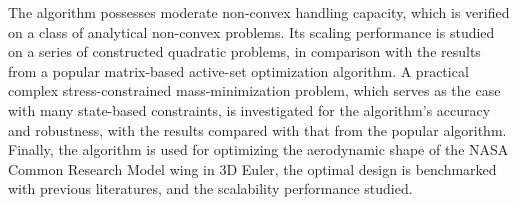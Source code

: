The algorithm possesses moderate non-convex handling capacity, which is verified on a class of analytical non-convex problems. Its scaling performance is studied on a series of constructed quadratic problems, in comparison with the results from a popular matrix-based active-set optimization algorithm. A practical complex stress-constrained mass-minimization problem, which serves as the case with many state-based constraints, is investigated for the algorithm's accuracy and robustness, with the results compared with that from the popular algorithm. Finally, the algorithm is used for optimizing the aerodynamic shape of the NASA Common Research Model wing in 3D Euler, the optimal design is benchmarked with previous literatures, and the scalability performance studied.   